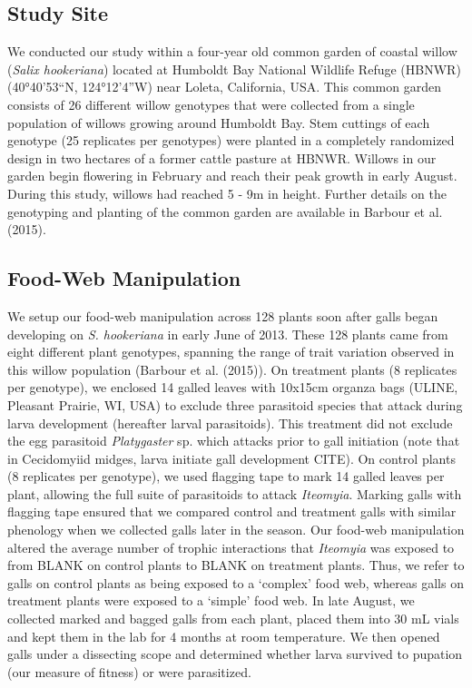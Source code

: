 \documentclass[]{elsarticle} %
\begin{document}
\subsection{Study Site}\label{study-site}

We conducted our study within a four-year old common garden of coastal
willow (\emph{Salix hookeriana}) located at Humboldt Bay National
Wildlife Refuge (HBNWR) (40°40'53``N, 124°12'4''W) near Loleta,
California, USA. This common garden consists of 26 different willow
genotypes that were collected from a single population of willows
growing around Humboldt Bay. Stem cuttings of each genotype (25
replicates per genotypes) were planted in a completely randomized design
in two hectares of a former cattle pasture at HBNWR. Willows in our
garden begin flowering in February and reach their peak growth in early
August. During this study, willows had reached 5 - 9m in height. Further
details on the genotyping and planting of the common garden are
available in Barbour et al. (2015).

\subsection{Food-Web Manipulation}\label{food-web-manipulation}

We setup our food-web manipulation across 128 plants soon after galls
began developing on \emph{S. hookeriana} in early June of 2013. These
128 plants came from eight different plant genotypes, spanning the range
of trait variation observed in this willow population (Barbour et al.
(2015)). On treatment plants (8 replicates per genotype), we enclosed 14
galled leaves with 10x15cm organza bags (ULINE, Pleasant Prairie, WI,
USA) to exclude three parasitoid species that attack during larva
development (hereafter larval parasitoids). This treatment did not
exclude the egg parasitoid \emph{Platygaster} sp. which attacks prior to
gall initiation (note that in Cecidomyiid midges, larva initiate gall
development CITE). On control plants (8 replicates per genotype), we
used flagging tape to mark 14 galled leaves per plant, allowing the full
suite of parasitoids to attack \emph{Iteomyia}. Marking galls with
flagging tape ensured that we compared control and treatment galls with
similar phenology when we collected galls later in the season. Our
food-web manipulation altered the average number of trophic interactions
that \emph{Iteomyia} was exposed to from BLANK on control plants to
BLANK on treatment plants. Thus, we refer to galls on control plants as
being exposed to a `complex' food web, whereas galls on treatment plants
were exposed to a `simple' food web. In late August, we collected marked
and bagged galls from each plant, placed them into 30 mL vials and kept
them in the lab for 4 months at room temperature. We then opened galls
under a dissecting scope and determined whether larva survived to
pupation (our measure of fitness) or were parasitized.
\end{document}
